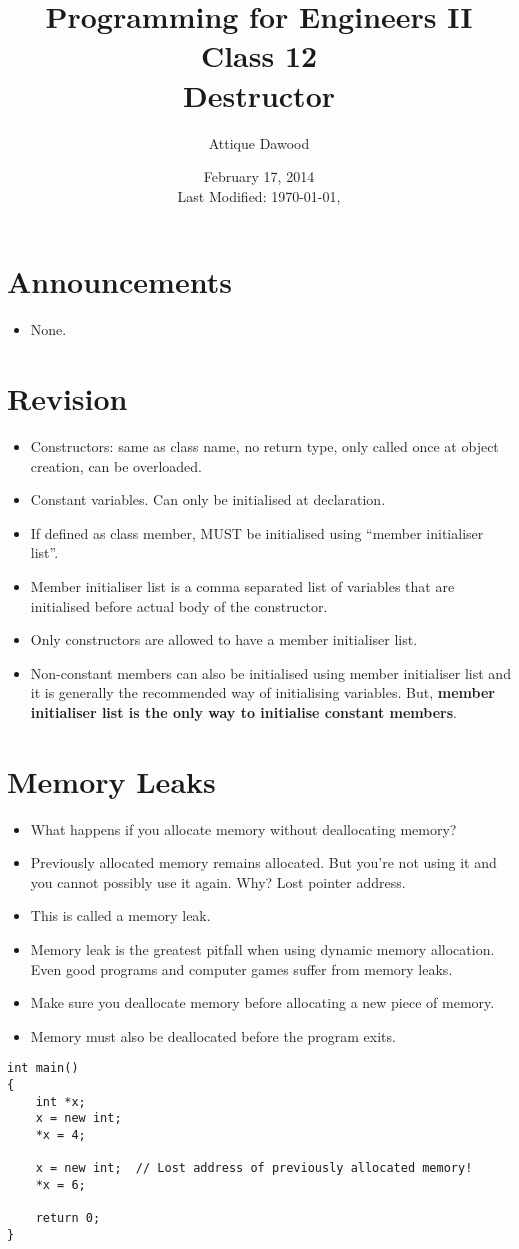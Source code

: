 \documentclass[12pt,a4paper]{article}
\title{\vspace{-2cm}Programming for Engineers II\\Class 12\\Destructor}
\author{Attique Dawood}
\date{February 17, 2014\\[0.2cm] Last Modified: \today, \currenttime}
\begin{document}
\maketitle
\section{Announcements}
\begin{itemize}
\item None.
\end{itemize}
\section{Revision}
\begin{itemize}
\item Constructors: same as class name, no return type, only called once at object creation, can be overloaded.
\item Constant variables. Can only be initialised at declaration.
\item If defined as class member, MUST be initialised using ``member initialiser list''.
\item Member initialiser list is a comma separated list of variables that are initialised before actual body of the constructor.
\item Only constructors are allowed to have a member initialiser list.
\item Non-constant members can also  be initialised using member initialiser list and it is generally the recommended way of initialising variables. But, \textbf{member initialiser list is the only way to initialise constant members}.
\end{itemize}
\section{Memory Leaks}
\begin{itemize}
\item What happens if you allocate memory without deallocating memory?
\item Previously allocated memory remains allocated. But you're not using it and you cannot possibly use it again. Why? Lost pointer address.
\item This is called a memory leak.
\item Memory leak is the greatest pitfall when using dynamic memory allocation. Even good programs and computer games suffer from memory leaks.
\item Make sure you deallocate memory before allocating a new piece of memory.
\item Memory must also be deallocated before the program exits.
\end{itemize}
\begin{lstlisting}[caption={Typical Memory Leak}]
int main()
{
	int *x;
	x = new int;
	*x = 4;

	x = new int;  // Lost address of previously allocated memory!
	*x = 6;
	
	return 0;
}
\end{lstlisting}
\end{document}
